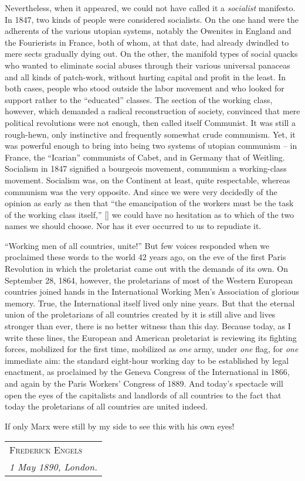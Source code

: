 Nevertheless, when it appeared, we could not have called it a \emph{socialist} manifesto. In 1847, two kinds of people were considered socialists. On the one hand were the adherents of the various utopian systems, notably the Owenites in England and the Fourierists in France, both of whom, at that date, had already dwindled to mere sects gradually dying out. On the other, the manifold types of social quacks who wanted to eliminate social abuses through their various universal panaceas and all kinds of patch-work, without hurting capital and profit in the least. In both cases, people who stood outside the labor movement and who looked for support rather to the ``educated'' classes. The section of the working class, however, which demanded a radical reconstruction of society, convinced that mere political revolutions were not enough, then called itself Communist. It was still a rough-hewn, only instinctive and frequently somewhat crude communism. Yet, it was powerful enough to bring into being two systems of utopian communism – in France, the ``Icarian'' communists of Cabet, and in Germany that of Weitling. Socialism in 1847 signified a bourgeois movement, communism a working-class movement. Socialism was, on the Continent at least, quite respectable, whereas communism was the very opposite. And since we were very decidedly of the opinion as early as then that ``the emancipation of the workers must be the task of the working class itself,'' [] we could have no hesitation as to which of the two names we should choose. Nor has it ever occurred to us to repudiate it. 

``Working men of all countries, unite!'' But few voices responded when we proclaimed these words to the world 42 years ago, on the eve of the first Paris Revolution in which the proletariat came out with the demands of its own. On September 28, 1864, however, the proletarians of most of the Western European countries joined hands in the International Working Men’s Association of glorious memory. True, the International itself lived only nine years. But that the eternal union of the proletarians of all countries created by it is still alive and lives stronger than ever, there is no better witness than this day. Because today, as I write these lines, the European and American proletariat is reviewing its fighting forces, mobilized for the first time, mobilized as \emph{one} army, under \emph{one} flag, for \emph{one} immediate aim: the standard eight-hour working day to be established by legal enactment, as proclaimed by the Geneva Congress of the International in 1866, and again by the Paris Workers’ Congress of 1889. And today’s spectacle will open the eyes of the capitalists and landlords of all countries to the fact that today the proletarians of all countries are united indeed. 

If only Marx were still by my side to see this with his own eyes! 


\hfill
\begin{tabular}{@{}l@{}}
\scshape Frederick Engels \\
\emph{1 May 1890, London.}
\end{tabular}
